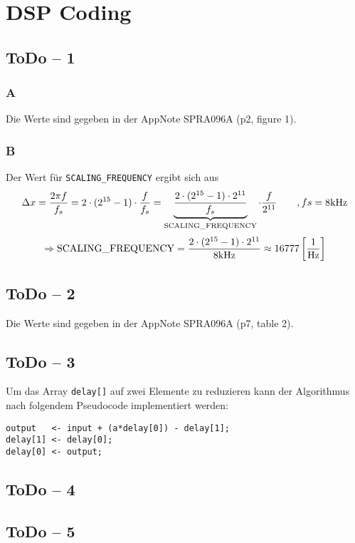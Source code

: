 \section{DSP Coding}

\subsection{ToDo -- 1}

\subsubsection{A}
Die Werte sind gegeben in der AppNote SPRA096A (p2, figure 1).

\subsubsection{B}
Der Wert für \lstinline{SCALING_FREQUENCY} ergibt sich aus
\[
	\Delta x = \frac{2 \pi f}{f_s} \\
	= 2 \cdot (2^{15} - 1 ) \cdot \frac{f}{f_s} \\
	= \underbrace{\frac{2 \cdot (2^{15} -1 )
		\cdot 2^{11}}{f_s}}_{\text{\lstinline{SCALING_FREQUENCY}}}
		\cdot \frac{f}{2^{11}} \qquad ,fs = 8\text{kHz}
\]
\[
	\Rightarrow \text{\lstinline{SCALING_FREQUENCY}} = 
	\frac{2 \cdot (2^{15} -1 ) \cdot 2^{11}}{8\text{kHz}}
		\approx 16777 \left[ \frac{1}{\text{Hz}} \right]
\]

\subsection{ToDo -- 2}
Die Werte sind gegeben in der AppNote SPRA096A (p7, table 2).

\subsection{ToDo -- 3}
Um das Array \lstinline{delay[]} auf zwei Elemente zu reduzieren kann der
Algorithmus nach folgendem Pseudocode implementiert werden:

\begin{lstlisting}
output   <- input + (a*delay[0]) - delay[1];
delay[1] <- delay[0];
delay[0] <- output;
\end{lstlisting}

\subsection{ToDo -- 4}


\subsection{ToDo -- 5}
